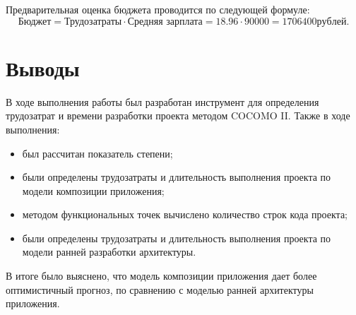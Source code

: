 \documentclass{bmstu}
\begin{document}
Предварительная оценка бюджета проводится по следующей формуле:
\begin{equation}
    \text{Бюджет} = \text{Трудозатраты} \cdot \text{Средняя зарплата} = \text{18.96} \cdot \text{90000} = 1706400 рублей.
\end{equation}

\section*{Выводы}

В ходе выполнения работы был разработан инструмент для определения трудозатрат и времени разработки проекта методом COCOMO II. Также в ходе выполнения:

\begin{itemize}
    \item был рассчитан показатель степени;
    \item были определены трудозатраты и длительность выполнения проекта по модели композиции приложения;
    \item методом функциональных точек вычислено количество строк кода проекта;
    \item были определены трудозатраты и длительность выполнения проекта по модели ранней разработки архитектуры.
\end{itemize}

В итоге было выяснено, что модель композиции приложения дает более оптимистичный прогноз, по сравнению с моделью ранней архитектуры приложения.
\end{document}
